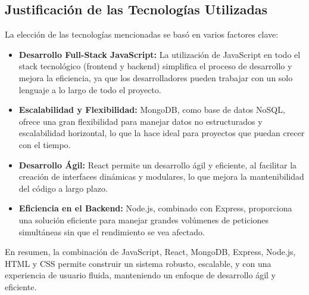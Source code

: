 \subsection{Justificación de las Tecnologías Utilizadas}
La elección de las tecnologías mencionadas se basó en varios factores clave:
\begin{itemize}
    \item \textbf{Desarrollo Full-Stack JavaScript:} La utilización de JavaScript en todo el stack tecnológico (frontend y backend) simplifica el proceso de desarrollo y mejora la eficiencia, ya que los desarrolladores pueden trabajar con un solo lenguaje a lo largo de todo el proyecto.
    \item \textbf{Escalabilidad y Flexibilidad:} MongoDB, como base de datos NoSQL, ofrece una gran flexibilidad para manejar datos no estructurados y escalabilidad horizontal, lo que la hace ideal para proyectos que puedan crecer con el tiempo.
    \item \textbf{Desarrollo Ágil:} React permite un desarrollo ágil y eficiente, al facilitar la creación de interfaces dinámicas y modulares, lo que mejora la mantenibilidad del código a largo plazo.
    \item \textbf{Eficiencia en el Backend:} Node.js, combinado con Express, proporciona una solución eficiente para manejar grandes volúmenes de peticiones simultáneas sin que el rendimiento se vea afectado.
\end{itemize}

En resumen, la combinación de JavaScript, React, MongoDB, Express, Node.js, HTML y CSS permite construir un sistema robusto, escalable, y con una experiencia de usuario fluida, manteniendo un enfoque de desarrollo ágil y eficiente.
